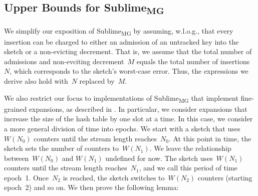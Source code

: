 \documentclass[sigconf]{acmart}
\newcommand{\sketch}{Sublime}
\newcommand{\sketchmg}{\sketch\textsubscript{MG}\xspace}
\begin{document}
\subsection{Upper Bounds for \sketchmg}\label{apx:upper_bounds_mg_normal}
We simplify our exposition of \sketchmg by assuming, w.l.o.g., that every insertion can be charged to either an admission of an untracked key into the sketch or a non-evicting decrement.
That is, we assume that the total number of admissions and non-evciting decrement~$M$ equals the total number of insertions~$N$, which corresponds to the sketch's worst-case error.
Thus, the expressions we derive also hold with~$N$ replaced by~$M$.

We also restrict our focus to implementations of \sketchmg that implement fine-grained expansions, as described in .
In particular, we consider expansions that increase the size of the hash table by one slot at a time.
In this case, we consider a more general division of time into epochs.
We start with a sketch that uses~$W(N_0)$ counters until the stream length reaches~$N_0$.
At this point in time, the sketch sets the number of counters to~$W(N_1)$.
We leave the relationship between~$W(N_0)$ and $W(N_1)$ undefined for now.
The sketch uses~$W(N_1)$ counters until the stream length reaches~$N_1$, and we call this period of time epoch~1.
Once~$N_2$ is reached, the sketch switches to~$W(N_2)$ counters (starting epoch~2) and so on.
We then prove the following lemma:
\end{document}

